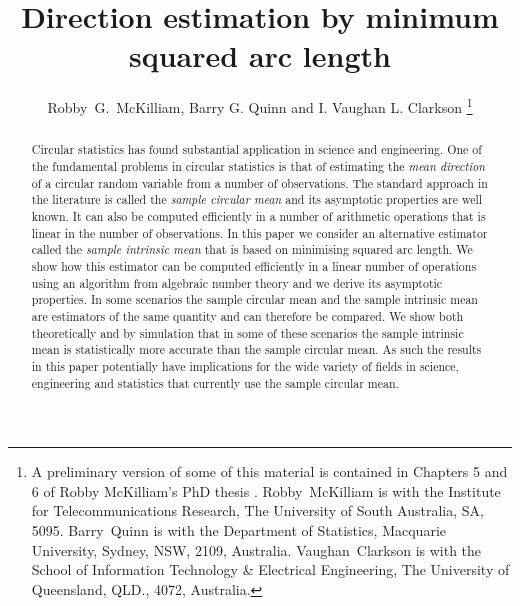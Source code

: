 \documentclass[journal]{../bib/IEEEtran}
\begin{document}
\title{Direction estimation by minimum squared arc length}

\author{Robby~G.~McKilliam, Barry G. Quinn and I. Vaughan L. Clarkson%
  \thanks{A preliminary version of some of this material is contained in Chapters 5 and 6 of Robby McKilliam's PhD thesis \cite{McKilliam2010thesis}. Robby~McKilliam is with the Institute for Telecommunications Research, The University of South Australia, SA, 5095.  Barry~Quinn is with the Department of Statistics, Macquarie University, Sydney, NSW, 2109, Australia.   Vaughan~Clarkson is with the School of Information Technology \& Electrical Engineering, The University of Queensland, QLD., 4072, Australia.}
     }

\maketitle

 
\begin{abstract}
Circular statistics has found substantial application in science and engineering. One of the fundamental problems in circular statistics is that of estimating the \emph{mean direction} of a circular random variable from a number of observations. %
The standard approach in the literature is called the \emph{sample circular mean} and its asymptotic properties are well known. It can also be computed efficiently in a number of arithmetic operations that is linear in the number of observations. In this paper we consider an alternative estimator called the \emph{sample intrinsic mean} that is based on minimising squared arc length. We show how this estimator can be computed efficiently in a linear number of operations using an algorithm from algebraic number theory and we derive its asymptotic properties. 
In some scenarios the sample circular mean and the sample intrinsic mean are estimators of the same quantity and can therefore be compared.  We show both theoretically and by simulation that in some of these scenarios the sample intrinsic mean is statistically more accurate than the sample circular mean. As such the results in this paper potentially have implications for the wide variety of fields in science, engineering and statistics that currently use the sample circular mean.
\end{abstract}
\end{document}
